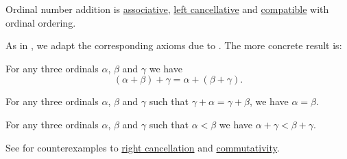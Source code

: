 



\begin{proposition}\label{thm:ordinal_addition_properties}
  Ordinal number addition is \hyperref[def:magma/associative]{associative}, \hyperref[def:magma/cancellative]{left cancellative} and \hyperref[def:preordered_magma]{compatible} with ordinal ordering.

  As in , we adapt the corresponding axioms due to . The more concrete result is:
  \begin{thmenum}
     For any three ordinals \( \alpha \), \( \beta \) and \( \gamma \) we have
    \begin{equation*}
      (\alpha + \beta) + \gamma = \alpha + (\beta + \gamma).
    \end{equation*}

     For any three ordinals \( \alpha \), \( \beta \) and \( \gamma \) such that \( \gamma + \alpha = \gamma + \beta \), we have \( \alpha = \beta \).

     For any three ordinals \( \alpha \), \( \beta \) and \( \gamma \) such that \( \alpha < \beta \) we have \( \alpha + \gamma < \beta + \gamma \).
  \end{thmenum}

   See  for counterexamples to \hyperref[def:magma/cancellative]{right cancellation} and \hyperref[def:magma/commutativity]{commutativity}.
\end{proposition}

